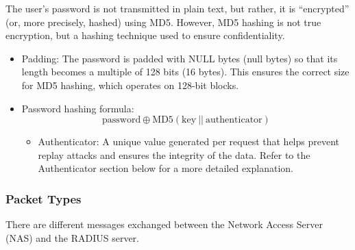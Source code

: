 \hfill 

The user’s password is not transmitted in plain text, but rather, it is “encrypted” (or, more precisely, hashed) using MD5. However, MD5 hashing is not true encryption, but a hashing technique used to ensure confidentiality.

\begin{itemize}
    \item Padding: The password is padded with NULL bytes (null bytes) so that its length becomes a multiple of 128 bits (16 bytes). This ensures the correct size for MD5 hashing, which operates on 128-bit blocks.
    \item Password hashing formula: 
    \begin{equation*}
        \text{password} \oplus \text{MD5}(\text{key}\ ||\ \text{authenticator})
    \end{equation*}
    \begin{itemize}
        \item Authenticator: A unique value generated per request that helps prevent replay attacks and ensures the integrity of the data. Refer to the Authenticator section below for a more detailed explanation.
    \end{itemize}
\end{itemize}

\subsubsection{Packet Types}
There are different messages exchanged between the Network Access Server (NAS) and the RADIUS server.

